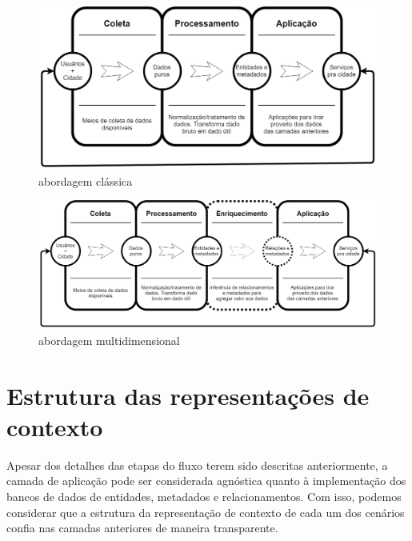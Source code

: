 \begin{figure}[h]
\caption{abordagem clássica}
\centering
\includegraphics[width=1.0\textwidth,height=1.0\textheight,keepaspectratio]{images/PoorFlow-2.png}
\end{figure}

\begin{figure}[h]
\caption{abordagem multidimensional}
\centering
\includegraphics[width=1.0\textwidth,height=1.0\textheight,keepaspectratio]{images/FullFlow-2.png}
\end{figure}

\section{Estrutura das representações de contexto}

Apesar dos detalhes das etapas do fluxo terem sido descritas anteriormente, a camada de aplicação pode ser considerada agnóstica quanto à implementação dos bancos de dados de entidades, metadados e relacionamentos. Com isso, podemos considerar que a estrutura da representação de contexto de cada um dos cenários confia nas camadas anteriores de maneira transparente.

\newpage

